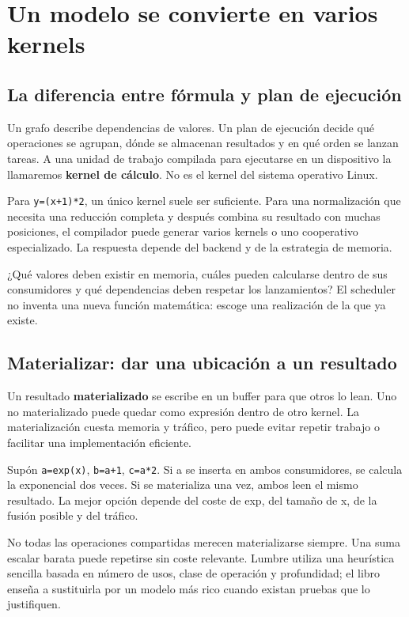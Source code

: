 \documentclass[12pt,a4paper,oneside]{report}
\begin{document}
\chapter{Un modelo se convierte en varios kernels}
\label{ch:schedule}
\section{La diferencia entre fórmula y plan de ejecución}
Un grafo describe dependencias de valores. Un plan de ejecución decide qué operaciones se agrupan, dónde se almacenan resultados y en qué orden se lanzan tareas. A una unidad de trabajo compilada para ejecutarse en un dispositivo la llamaremos \textbf{kernel de cálculo}. No es el kernel del sistema operativo Linux.

Para \texttt{y=(x+1)*2}, un único kernel suele ser suficiente. Para una normalización que necesita una reducción completa y después combina su resultado con muchas posiciones, el compilador puede generar varios kernels o uno cooperativo especializado. La respuesta depende del backend y de la estrategia de memoria.

\begin{idea}
¿Qué valores deben existir en memoria, cuáles pueden calcularse dentro de sus consumidores y qué dependencias deben respetar los lanzamientos? El scheduler no inventa una nueva función matemática: escoge una realización de la que ya existe.

\end{idea}
\section{Materializar: dar una ubicación a un resultado}
Un resultado \textbf{materializado} se escribe en un buffer para que otros lo lean. Uno no materializado puede quedar como expresión dentro de otro kernel. La materialización cuesta memoria y tráfico, pero puede evitar repetir trabajo o facilitar una implementación eficiente.

Supón \texttt{a=exp(x)}, \texttt{b=a+1}, \texttt{c=a*2}. Si a se inserta en ambos consumidores, se calcula la exponencial dos veces. Si se materializa una vez, ambos leen el mismo resultado. La mejor opción depende del coste de exp, del tamaño de x, de la fusión posible y del tráfico.

No todas las operaciones compartidas merecen materializarse siempre. Una suma escalar barata puede repetirse sin coste relevante. Lumbre utiliza una heurística sencilla basada en número de usos, clase de operación y profundidad; el libro enseña a sustituirla por un modelo más rico cuando existan pruebas que lo justifiquen.
\end{document}
